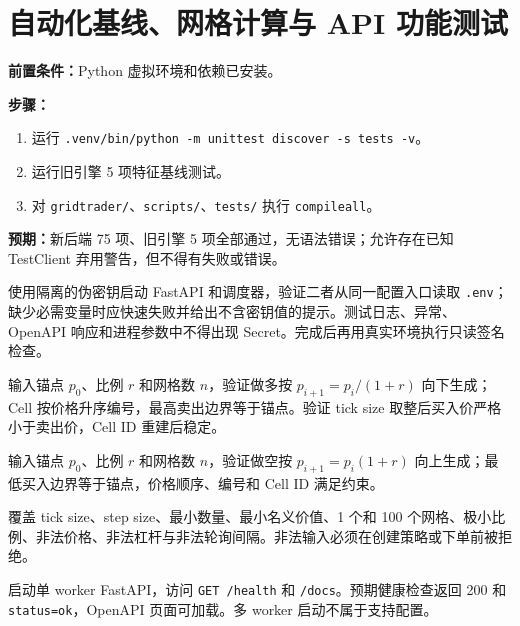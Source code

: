 \section{自动化基线、网格计算与 API 功能测试}


\textbf{前置条件：}Python 虚拟环境和依赖已安装。\par
\textbf{步骤：}
\begin{enumerate}
  \item 运行 \texttt{.venv/bin/python -m unittest discover -s tests -v}。
  \item 运行旧引擎 5 项特征基线测试。
  \item 对 \texttt{gridtrader/}、\texttt{scripts/}、\texttt{tests/} 执行 \texttt{compileall}。
\end{enumerate}
\textbf{预期：}新后端 75 项、旧引擎 5 项全部通过，无语法错误；允许存在已知 TestClient 弃用警告，但不得有失败或错误。


使用隔离的伪密钥启动 FastAPI 和调度器，验证二者从同一配置入口读取 \texttt{.env}；缺少必需变量时应快速失败并给出不含密钥值的提示。测试日志、异常、OpenAPI 响应和进程参数中不得出现 Secret。完成后再用真实环境执行只读签名检查。


输入锚点 $p_0$、比例 $r$ 和网格数 $n$，验证做多按
$p_{i+1}=p_i/(1+r)$ 向下生成；Cell 按价格升序编号，最高卖出边界等于锚点。验证 tick size 取整后买入价严格小于卖出价，Cell ID 重建后稳定。


输入锚点 $p_0$、比例 $r$ 和网格数 $n$，验证做空按
$p_{i+1}=p_i(1+r)$ 向上生成；最低买入边界等于锚点，价格顺序、编号和 Cell ID 满足约束。


覆盖 tick size、step size、最小数量、最小名义价值、1 个和 100 个网格、极小比例、非法价格、非法杠杆与非法轮询间隔。非法输入必须在创建策略或下单前被拒绝。


启动单 worker FastAPI，访问 \texttt{GET /health} 和 \texttt{/docs}。预期健康检查返回 200 和 \texttt{status=ok}，OpenAPI 页面可加载。多 worker 启动不属于支持配置。


